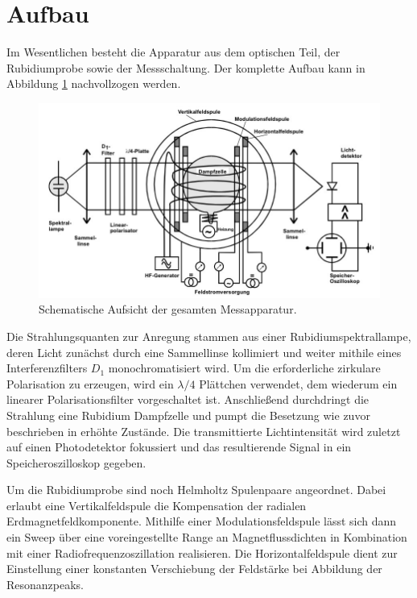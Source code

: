 \section{Aufbau}
\label{sec:Aufbau}

Im Wesentlichen besteht die Apparatur aus dem optischen Teil, der Rubidiumprobe sowie der Messschaltung. Der komplette Aufbau
kann in Abbildung \ref{fig:aufbau} nachvollzogen werden.

\begin{figure}[H]
	\centering
	\includegraphics[width=0.8\linewidth]{content/grafik/aufbau.jpg}
	\caption{Schematische Aufsicht der gesamten Messapparatur. \cite{pumpen}}
	\label{fig:aufbau}
\end{figure}

Die Strahlungsquanten zur Anregung stammen aus einer Rubidiumspektrallampe, deren Licht zunächst durch eine Sammellinse kollimiert
und weiter mithile eines Interferenzfilters $D_1$ monochromatisiert wird. Um die erforderliche zirkulare Polarisation zu
erzeugen, wird ein $\lambda/4$ Plättchen verwendet, dem wiederum ein linearer Polarisationsfilter vorgeschaltet ist. Anschließend
durchdringt die Strahlung eine Rubidium Dampfzelle und pumpt die Besetzung wie zuvor beschrieben in erhöhte Zustände. Die
transmittierte Lichtintensität wird zuletzt auf einen Photodetektor fokussiert und das resultierende Signal in ein
Speicheroszilloskop gegeben. 

Um die Rubidiumprobe sind noch Helmholtz Spulenpaare angeordnet. Dabei erlaubt eine Vertikalfeldspule die Kompensation
der radialen Erdmagnetfeldkomponente. Mithilfe einer Modulationsfeldspule lässt sich dann ein Sweep über eine voreingestellte
Range an Magnetflussdichten in Kombination mit einer Radiofrequenzoszillation realisieren. Die Horizontalfeldspule dient zur
Einstellung einer konstanten Verschiebung der Feldstärke bei Abbildung der Resonanzpeaks. 
